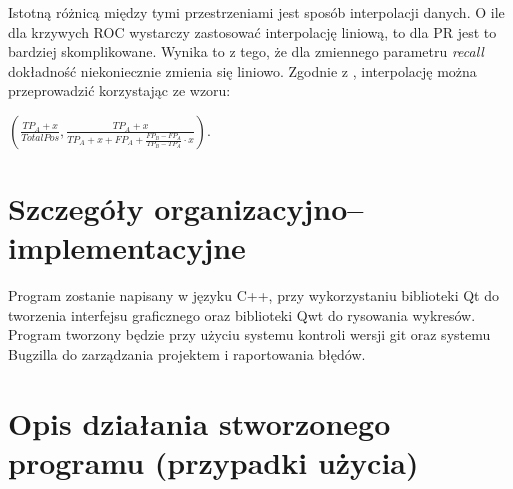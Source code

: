 \documentclass[12pt,a4paper,titlepage]{article}
\begin{document}
Istotną różnicą między tymi przestrzeniami jest sposób interpolacji danych. O ile dla krzywych ROC wystarczy zastosować interpolację liniową, to dla PR jest to bardziej skomplikowane. Wynika to z tego, że dla zmiennego parametru \textit{recall} dokładność niekoniecznie zmienia się liniowo. Zgodnie z \cite{roc}, interpolację można przeprowadzić korzystając ze wzoru:\\
\begin{center}
$(\frac{TP_{A}+x}{Total Pos}, \frac{TP_{A}+x}{TP_{A}+x+FP_{A} + \frac{FP_{B}-FP_{A}}{TP_{B}-TP_{A}} \cdot x})$.
\end{center}
\section{Szczegóły organizacyjno–implementacyjne}
Program zostanie napisany w języku C++, przy wykorzystaniu biblioteki Qt do tworzenia interfejsu graficznego oraz biblioteki Qwt do rysowania wykresów.
Program tworzony będzie przy użyciu systemu kontroli wersji git oraz systemu Bugzilla do zarządzania projektem i raportowania błędów.
\section{Opis działania stworzonego programu (przypadki użycia)}
\end{document}
